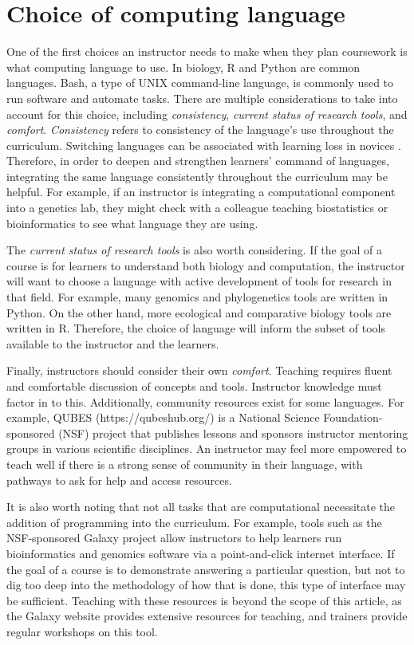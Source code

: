 \section{Choice of computing language}

One of the first choices an instructor needs to make when they plan coursework is what computing language to use.
In biology, R and Python are common languages.
Bash, a type of UNIX command-line language, is commonly used to run software and automate tasks.
There are multiple considerations to take into account for this choice, including
\textit{consistency}, \textit{current status of research tools}, and \textit{comfort}.
\textit{Consistency} refers to consistency of the language's use throughout the curriculum.
Switching languages can be associated with learning loss in novices \citep{wu1990}.
Therefore, in order to deepen and strengthen learners' command of languages, integrating the same language consistently throughout the curriculum may be helpful.
For example, if an instructor is integrating a computational component into a genetics lab, they might check with a colleague teaching biostatistics or bioinformatics to see what language they are using.


The \textit{current status of research tools} is also worth considering. 
If the goal of a course is for learners to understand both biology and computation, the instructor will want to choose a language with active development of tools for research in that field.
For example, many genomics and phylogenetics tools are written in Python. 
On the other hand, more ecological and comparative biology tools are written in R.
Therefore, the choice of language will inform the subset of tools available to the instructor and the learners.

Finally, instructors should consider their own \textit{comfort}. 
Teaching requires fluent and comfortable discussion of concepts and tools.
Instructor knowledge must factor in to this.
Additionally, community resources exist for some languages. 
For example, QUBES (https://qubeshub.org/) is a National Science Foundation-sponsored (NSF) project that publishes lessons and sponsors instructor mentoring groups in various scientific disciplines.
An instructor may feel more empowered to teach well if there is a strong sense of community in their language, with pathways to ask for help and access resources.

It is also worth noting that not all tasks that are computational necessitate the addition of programming into the curriculum.
For example, tools such as the NSF-sponsored Galaxy project allow instructors to help learners run bioinformatics and genomics software via a point-and-click internet interface.
If the goal of a course is to demonstrate answering a particular question, but not to dig too deep into the methodology of how that is done, this type of interface may be sufficient.
Teaching with these resources is beyond the scope of this article, as
the Galaxy website provides extensive resources for teaching,
and trainers provide regular workshops on this tool.

